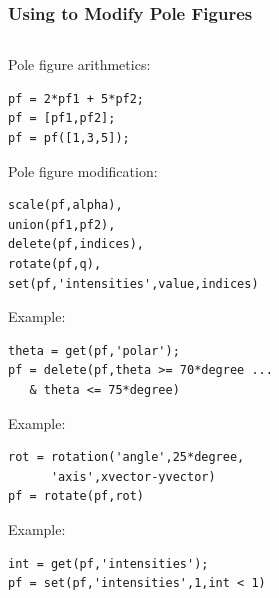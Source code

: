 \begin{frame}[fragile]

  \frametitle{Using \MTEX to Modify Pole Figures}

  \begin{columns}

    \begin{column}{8.5cm}

      Pole figure arithmetics:
\begin{lstlisting}
pf = 2*pf1 + 5*pf2;
pf = [pf1,pf2];
pf = pf([1,3,5]);
\end{lstlisting}

      Pole figure modification:

\begin{lstlisting}
scale(pf,alpha),
union(pf1,pf2),
delete(pf,indices),
rotate(pf,q),
set(pf,'intensities',value,indices)
\end{lstlisting}

      \begin{overprint}

        Example:
\begin{lstlisting}
theta = get(pf,'polar');
pf = delete(pf,theta >= 70*degree ...
   & theta <= 75*degree)
\end{lstlisting}
        Example:
\begin{lstlisting}
rot = rotation('angle',25*degree,
      'axis',xvector-yvector)
pf = rotate(pf,rot)
\end{lstlisting}
        Example:
\begin{lstlisting}
int = get(pf,'intensities');
pf = set(pf,'intensities',1,int < 1)
\end{lstlisting}

      \end{overprint}
    \end{column}


\end{columns}
\end{frame}
